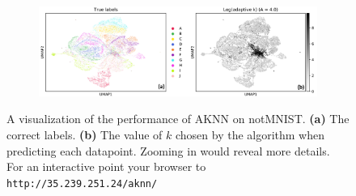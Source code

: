 \documentclass{article}
\newcommand{\comment}[3]{{\color{#1} {\bf #2 :} #3}}
\newcommand{\akshay}[1]{\comment{blue}{Akshay}{#1}}
\begin{document}

\begin{figure}[t]
    \centering
    \begin{subfigure}{0.95\textwidth}
    \centering
        \includegraphics[width=\linewidth]{figs/notMNIST/umapnotMNIST_combined.png}
    \end{subfigure}
    \caption{ A visualization of the performance of AKNN on notMNIST.
      {\bf (a)} The correct labels. {\bf (b)} The value of $k$ chosen
      by the algorithm when predicting each datapoint. Zooming in
      would reveal more details. For an interactive point your browser
    to \texttt{http://35.239.251.24/aknn/}}
  \label{fig:varyingadak}
\end{figure}
\end{document}
